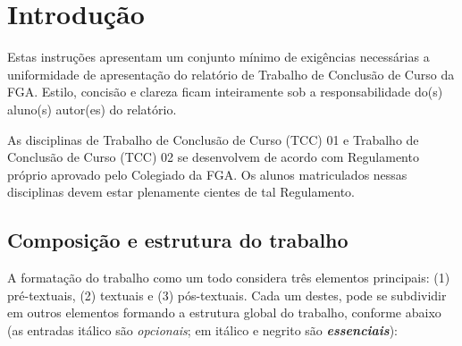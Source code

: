
\chapter[Introdução]{Introdução}

Estas instruções apresentam um conjunto mínimo de exigências necessárias a 
uniformidade de apresentação do relatório de Trabalho de Conclusão de Curso 
da FGA. Estilo, concisão e clareza ficam inteiramente sob a 
responsabilidade do(s) aluno(s) autor(es) do relatório.

As disciplinas de Trabalho de Conclusão de Curso (TCC) 01 e Trabalho de 
Conclusão de Curso (TCC) 02 se desenvolvem de acordo com Regulamento 
próprio aprovado pelo Colegiado da FGA. Os alunos matriculados nessas 
disciplinas devem estar plenamente cientes de tal Regulamento. 

\section{Composição e estrutura do trabalho}

A formatação do trabalho como um todo considera três elementos principais: 
(1) pré-textuais, (2) textuais e (3) pós-textuais. Cada um destes, pode se 
subdividir em outros elementos formando a estrutura global do trabalho, 
conforme abaixo (as entradas itálico são \textit{opcionais}; em itálico e
negrito são \textbf{\textit{essenciais}}):


